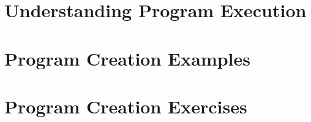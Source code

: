 






\cleardoublepage
\def\pageLang{none}
\section{Understanding Program Execution} %
\label{sec:understanding_program_execution}




\clearpage
\section{Program Creation Examples} %
\label{sec:program_creation_examples}




\clearpage
\section{Program Creation Exercises} %
\label{sec:program_creation_exercises}




% 

